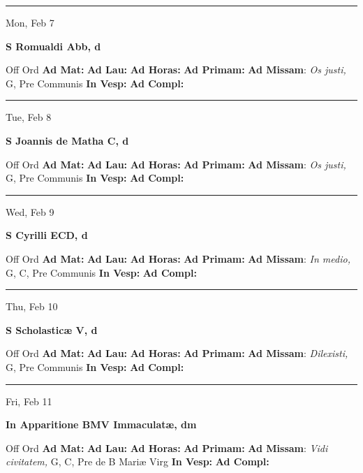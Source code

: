 \documentclass[letterpaper, 10pt]{article}
\begin{document}
\hrule
\begin{center}
Mon, Feb 7
\end{center}\textbf{ \large S Romualdi Abb, \textnormal{\normalsize d}}
\begin{justify}
Off Ord
\textbf{Ad Mat: }
\textbf{Ad Lau: }
\textbf{Ad Horas: }
\textbf{Ad Primam: }
\textbf{Ad Missam}: \textit{Os justi,} G, Pre Communis
\textbf{In Vesp: }
\textbf{Ad Compl: }\end{justify}



\hrule
\begin{center}
Tue, Feb 8
\end{center}\textbf{ \large S Joannis de Matha C, \textnormal{\normalsize d}}
\begin{justify}
Off Ord
\textbf{Ad Mat: }
\textbf{Ad Lau: }
\textbf{Ad Horas: }
\textbf{Ad Primam: }
\textbf{Ad Missam}: \textit{Os justi,} G, Pre Communis
\textbf{In Vesp: }
\textbf{Ad Compl: }\end{justify}



\hrule
\begin{center}
Wed, Feb 9
\end{center}\textbf{ \large S Cyrilli ECD, \textnormal{\normalsize d}}
\begin{justify}
Off Ord
\textbf{Ad Mat: }
\textbf{Ad Lau: }
\textbf{Ad Horas: }
\textbf{Ad Primam: }
\textbf{Ad Missam}: \textit{In medio,} G, C, Pre Communis
\textbf{In Vesp: }
\textbf{Ad Compl: }\end{justify}



\hrule
\begin{center}
Thu, Feb 10
\end{center}\textbf{ \large S Scholasticæ V, \textnormal{\normalsize d}}
\begin{justify}
Off Ord
\textbf{Ad Mat: }
\textbf{Ad Lau: }
\textbf{Ad Horas: }
\textbf{Ad Primam: }
\textbf{Ad Missam}: \textit{Dilexisti,} G, Pre Communis
\textbf{In Vesp: }
\textbf{Ad Compl: }\end{justify}



\hrule
\begin{center}
Fri, Feb 11
\end{center}\textbf{ \large In Apparitione BMV Immaculatæ, \textnormal{\normalsize dm}}
\begin{justify}
Off Ord
\textbf{Ad Mat: }
\textbf{Ad Lau: }
\textbf{Ad Horas: }
\textbf{Ad Primam: }
\textbf{Ad Missam}: \textit{Vidi civitatem,} G, C, Pre de B Mariæ Virg
\textbf{In Vesp: }
\textbf{Ad Compl: }\end{justify}
\end{document}
